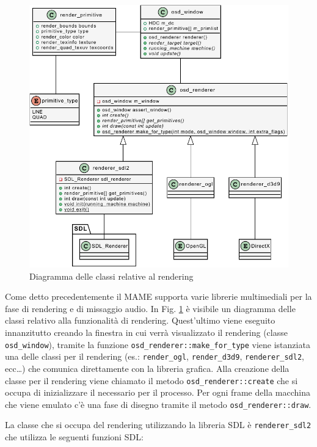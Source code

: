 \begin{figure}[H]
	\includegraphics[width=\linewidth]{immagini/class_renderingSDLFull}
	\caption{Diagramma delle classi relative al rendering}
	\label{fig:class_renderingSDLFull}
\end{figure}

Come detto precedentemente il MAME supporta varie librerie multimediali per la fase di rendering e di missaggio audio. In Fig. \ref{fig:class_renderingSDLFull} è visibile un diagramma delle classi relativo alla funzionalità di rendering. Quest'ultimo viene eseguito innanzitutto creando la finestra in cui verrà visualizzato il rendering (classe \verb|osd_window|), tramite la funzione \verb|osd_renderer::make_for_type| viene istanziata una delle classi per il rendering (es.: \verb|render_ogl|, \verb|render_d3d9|, \verb|renderer_sdl2|, ecc\dots) che comunica direttamente con la libreria grafica. Alla creazione della classe per il rendering viene chiamato il metodo \verb|osd_renderer::create| che si occupa di inizializzare il necessario per il processo. Per ogni frame della macchina che viene emulato c'è una fase di disegno tramite il metodo \verb|osd_renderer::draw|.

La classe che si occupa del rendering utilizzando la libreria SDL è \verb|renderer_sdl2| che utilizza le seguenti funzioni SDL:

